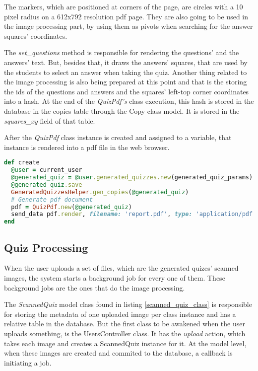 The markers, which are positioned at corners of the page, are circles with a 10 pixel radius on a 612x792 resolution pdf page. They are also going to be used in the image processing part, by using them as pivots when searching for the answer squares' coordinates.

The \textit{set\_questions} method is responsible for rendering the questions' and the answers' text. But, besides that, it draws the answers' squares, that are used by the students to select an answer when taking the quiz. Another thing related to the image processing is also being prepared at this point and that is the storing the ids of the questions and answers and the squares' left-top corner coordinates into a hash. At the end of the \textit{QuizPdf's} class execution, this hash is stored in the database in the copies table through the Copy class model. It is stored in the \textit{squares\_xy} field of that table.

After the \textit{QuizPdf} class instance is created and assigned to a variable, that instance is rendered into a pdf file in the web browser. 

\begin{lstlisting}[language=Ruby, caption={Create method of the GeneratedQuizzesController class}, label=create_method]
def create
  @user = current_user
  @generated_quiz = @user.generated_quizzes.new(generated_quiz_params)
  @generated_quiz.save
  GeneratedQuizzesHelper.gen_copies(@generated_quiz)
  # Generate pdf document
  pdf = QuizPdf.new(@generated_quiz)
  send_data pdf.render, filename: 'report.pdf', type: 'application/pdf', disposition: 'inline'
end
\end{lstlisting}





\subsection{Quiz Processing}

When the user uploads a set of files, which are the generated quizes' scanned images, the system starts a background job for every one of them. These background jobs are the ones that do the image processing. 

The \textit{ScannedQuiz} model class found in listing \ref{scanned_quiz_class} is responsible for storing the metadata of one uploaded image per class instance and has a relative table in the database. But the first class to be awakened when the user uploads something, is the UsersController class. It has the \textit{upload} action, which takes each image and creates a ScannedQuiz instance for it. At the model level, when these images are created and commited to the database, a callback is initiating a job. 


